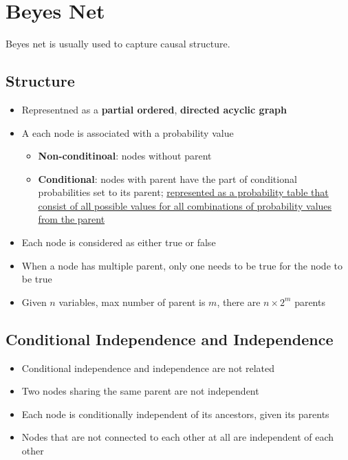 \section{Beyes Net}

  Beyes net is usually used to capture causal structure.

  \subsection{Structure}

    \begin{itemize}
      \item Representned as a \textbf{partial ordered},
      \textbf{directed acyclic graph}
      \item A each node is associated with a probability value
      \begin{itemize}
        \item \textbf{Non-conditinoal}: nodes without parent
        \item \textbf{Conditional}: nodes with parent have the  part
        of conditional probabilities set to its parent; \ul{represented
        as a probability table that consist of all possible values for all
        combinations of probability values from the parent}
      \end{itemize}

      \item Each node is considered as either true or false
      \item When a node has multiple parent, only one needs to be true for the
      node to be true
      \item Given $ n $ variables, max number of parent is $ m $, there are
      $ n \times 2^{m} $ parents
    \end{itemize}

  \subsection{Conditional Independence and Independence}

    \begin{itemize}
      \item Conditional independence and independence are not related
      \item Two nodes sharing the same parent are not independent
      \item Each node is conditionally independent of its ancestors,
      given its parents
      \item Nodes that are not connected to each other at all
      are independent of each other
    \end{itemize}

